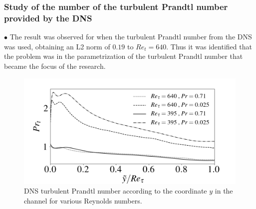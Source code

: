\documentclass[xcolor=dvipsnames,8pt,aspectratio=34]{beamer}
\begin{document}
		\begin{frame}
		\frametitle{Study of the number of the turbulent Prandtl number provided by the DNS}
		\begin{minipage}[h!]{0.25\textwidth}
			$\bullet$ The result was observed for when the turbulent Prandtl number from the DNS was used, obtaining an L2 norm of $ 0.19 $ to $ Re_t = 640 $. Thus it was identified that the problem was in the parametrization of the turbulent Prandtl number that became the focus of the research.
		\end{minipage}\hfill
		\begin{minipage}[h!]{0.1\textwidth}
		\end{minipage}
		\begin{minipage}[h!]{0.65\textwidth}
			\begin{figure}
				\centering
				\includegraphics[angle=0, scale=0.30]{fotos_formatacao_final/DNS_PRt}
				\caption{DNS turbulent Prandtl number according to the coordinate $ y $ in the channel for various Reynolds numbers.}
			\end{figure}
		\end{minipage}	
		\end{frame}
	
\end{document}
